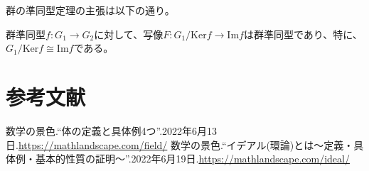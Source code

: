 \documentclass[a4paper, 10pt, dvipdfmx]{jlreq}
\begin{document}
群の準同型定理の主張は以下の通り。

群準同型$f:G_1 \to G_2$に対して、写像$F:G_1/\mathrm{Ker}f \to \mathrm{Im}f$は群準同型であり、特に、$G_1/\mathrm{Ker}f \cong \mathrm{Im}f$である。

\section{参考文献}
\begin{thebibliography}{9}
  数学の景色.“体の定義と具体例4つ”.2022年6月13日.\url{https://mathlandscape.com/field/}
  数学の景色.“イデアル(環論)とは～定義・具体例・基本的性質の証明～”.2022年6月19日.\url{https://mathlandscape.com/ideal/}
\end{thebibliography}
\end{document}
